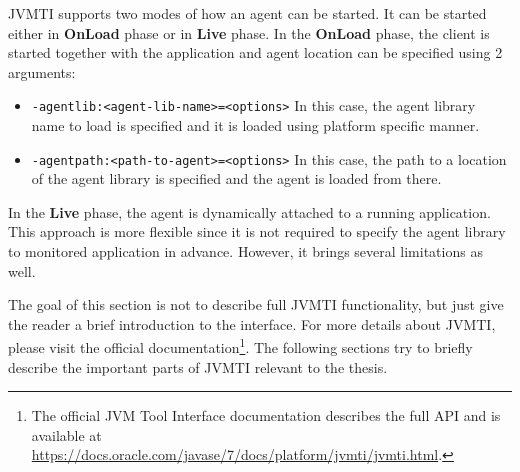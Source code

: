 JVMTI supports two modes of how an agent can be started. It can be started either in \textbf{OnLoad} phase or in \textbf{Live} phase. In the \textbf{OnLoad} phase, the client is started together with the application and agent location can be specified using 2 arguments:
\begin{itemize}
	\item \texttt{-agentlib:<agent-lib-name>=<options>} \newline
	In this case, the agent library name to load is specified and it is loaded using platform specific manner.
	\item \texttt{-agentpath:<path-to-agent>=<options>} \newline
	In this case, the path to a location of the agent library is specified and the agent is loaded from there.
\end{itemize}

In the \textbf{Live} phase, the agent is dynamically attached to a running application. This approach is more flexible since it is not required to specify the agent library to monitored application in advance. However, it brings several limitations as well.

The goal of this section is not to describe full JVMTI functionality, but just give the reader a brief introduction to the interface. For more details about JVMTI, please visit the official documentation\footnote{The official JVM Tool Interface documentation describes the full API and is available at \url{https://docs.oracle.com/javase/7/docs/platform/jvmti/jvmti.html}.}. The following sections try to briefly describe the important parts of JVMTI relevant to the thesis.

